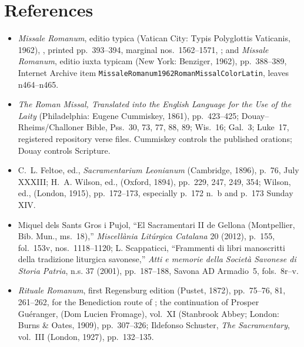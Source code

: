 \section*{References}

{\TriptychReferenceFont
{}
\begin{itemize}[leftmargin=1.1em,labelsep=0.35em,itemsep=0em,topsep=0.15em,parsep=0pt]
\item \emph{Missale Romanum}, editio typica (Vatican City: Typis
Polyglottis Vaticanis, 1962), , printed pp.~393--394, marginal nos.~1562--1571,
;
and \emph{Missale Romanum}, editio iuxta typicam (New York: Benziger, 1962),
pp.~388--389, Internet Archive item
\texttt{MissaleRomanum1962\allowbreak RomanMissal\allowbreak ColorLatin},
leaves n464--n465.

\item \emph{The Roman Missal, Translated into the English Language for the
Use of the Laity} (Philadelphia: Eugene Cummiskey, 1861), pp.~423--425;
Douay--Rheims/Challoner Bible, Pss.~30, 73, 77, 88, 89; Wis.~16; Gal.~3;
Luke~17, registered repository verse files. Cummiskey controls the published
orations; Douay controls Scripture.

\ifdefined\TriptychSynthesisEdition\else
\item C.~L. Feltoe, ed., \emph{Sacramentarium Leonianum} (Cambridge, 1896),
p.~76, July XXXIII; H.~A. Wilson, ed.,
 (Oxford, 1894), pp.~229, 247, 249, 354; Wilson, ed.,
 (London, 1915), pp.~172--173,
especially p.~172 n.~b and p.~173 Sunday XIV.

\item Miquel dels Sants Gros i Pujol, ``El Sacramentari II de Gellona
(Montpellier, Bib. Mun., ms.~18),'' \emph{Miscel\textperiodcentered lània
Litúrgica Catalana} 20 (2012), p.~155, fol.~153v, nos.~1118--1120;
L. Scappaticci, ``Frammenti di libri manoscritti della tradizione liturgica
savonese,'' \emph{Atti e memorie della Società Savonese di Storia Patria},
n.s. 37 (2001), pp.~187--188, Savona AD Armadio~5, fols.~8r--v.
\fi

\item \emph{Rituale Romanum}, first Regensburg edition (Pustet, 1872),
pp.~75--76, 81, 261--262, for the Benediction route of
; the continuation of Prosper Guéranger,
 (Dom Lucien Fromage), vol.~XI (Stanbrook Abbey; London: Burns \& Oates,
1909), pp.~307--326; Ildefonso Schuster,
\emph{The Sacramentary}, vol.~III (London, 1927), pp.~132--135.


\end{itemize}}

